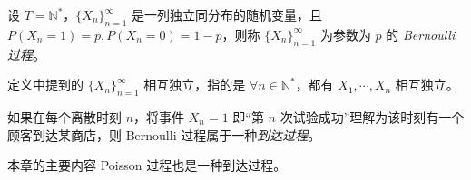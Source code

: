 \documentclass[../main.tex]{subfiles}
\begin{document}
\begin{definition}\label{def:6.2.1}
    设 $T=\mathbb N^*$，$\{X_n\}_{n=1}^\infty$ 是一列独立同分布的随机变量，且 $P(X_n=1)=p,P(X_n=0)=1-p$，则称 $\{X_n\}_{n=1}^\infty$ 为参数为 $p$ 的 \emph{Bernoulli 过程}。
\end{definition}

定义中提到的 $\{X_n\}_{n=1}^\infty$ 相互独立，指的是 $\forall n\in\mathbb N^*$，都有 $X_1,\cdots,X_n$ 相互独立。

如果在每个离散时刻 $n$，将事件 $X_n=1$ 即“第 $n$ 次试验成功”理解为该时刻有一个顾客到达某商店，则 Bernoulli 过程属于一种\emph{到达过程}。

本章的主要内容 Poisson 过程也是一种到达过程。
\end{document}
